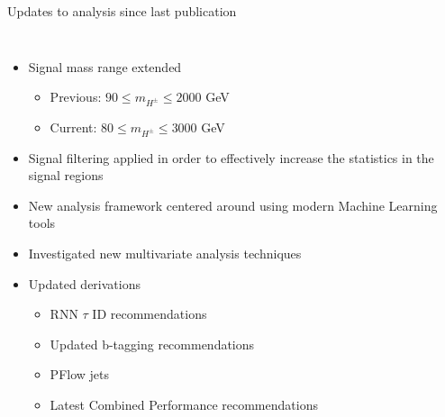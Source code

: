 \documentclass[aspectratio=169,xcolor=table]{beamer}
\begin{document}
    \begin{frame}[t]{Updates to analysis since last publication}
      \begin{columns}
        \begin{itemize}
          \item Signal mass range extended 
          \begin{itemize}
            \item Previous: $90 \leq m_{H^{\pm}} \leq 2000$ GeV
            \item Current:  $80 \leq m_{H^{\pm}} \leq 3000$ GeV
          \end{itemize}
          \item Signal filtering applied in order to effectively increase the statistics in the signal regions
          \item New analysis framework centered around using modern Machine Learning tools
          \item Investigated new multivariate analysis techniques
          \item Updated derivations
          \vspace{-3.5mm}
          \begin{multicols}{2}
            \begin{itemize}
              \tiny
              \item RNN $\tau$ ID recommendations
              \item Updated b-tagging recommendations
              \item PFlow jets
              \item Latest Combined Performance recommendations
            \end{itemize}
          \end{multicols}
        \end{itemize}


\end{columns}
\end{frame}
\end{document}
